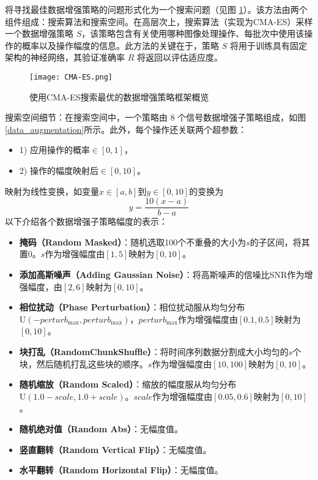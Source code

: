 \documentclass[master]{thesis-uestc}
\begin{document}
将寻找最佳数据增强策略的问题形式化为一个搜索问题（见图 \ref{CMA-ES}）。该方法由两个组件组成：搜索算法和搜索空间。在高层次上，搜索算法（实现为CMA-ES）采样一个数据增强策略 \( S \)，该策略包含有关使用哪种图像处理操作、每批次中使用该操作的概率以及操作幅度的信息。此方法的关键在于，策略 \( S \) 将用于训练具有固定架构的神经网络，其验证准确率 \( R \) 将返回以评估适应度。
\begin{figure}[h]
    \centering
    \texttt{[image: CMA-ES.png]}
    \caption{使用CMA-ES搜索最优的数据增强策略框架概览}
    \label{CMA-ES}
\end{figure}
搜索空间细节：在搜索空间中，一个策略由 8 个信号数据增强子策略组成，如图\ref{data_augmentation}所示。此外，每个操作还关联两个超参数：
\begin{itemize}
    \item 1) 应用操作的概率\(\in [0,1]\)，
    \item 2) 操作的幅度映射后\(\in [0,10]\)。
\end{itemize}
映射为线性变换，如变量\(x \in [a,b]\)到\(y \in [0,10]\)的变换为
\begin{equation}
    y = \frac{10(x - a)}{b - a}
    \end{equation}
以下介绍各个数据增强子策略幅度的表示：
\begin{itemize}
    \item \textbf{掩码（Random Masked）}：随机选取100个不重叠的大小为$s$的子区间，将其置0。$s$作为增强幅度由\([1,5]\)映射为\([0,10]\)。

    \item \textbf{添加高斯噪声（Adding Gaussian Noise）}：将高斯噪声的信噪比SNR作为增强幅度，由\([2,6]\)映射为\([0,10]\)。

    \item \textbf{相位扰动（Phase Perturbation）}：相位扰动服从均匀分布$\text{U}(-perturb_{\text{max}}, perturb_{\text{max}})$，$perturb_{\text{max}}$作为增强幅度由\([0.1,0.5]\)映射为\([0,10]\)。

    \item \textbf{块打乱（RandomChunkShuffle）}：将时间序列数据分割成大小均匀的$s$个块，然后随机打乱这些块的顺序。$s$作为增强幅度由\([10,100]\)映射为\([0,10]\)。

    \item \textbf{随机缩放（Random Scaled）}：缩放的幅度服从均匀分布$\text{U}(1.0-scale, 1.0+scale)$。$scale$作为增强幅度由\([0.05,0.6]\)映射为\([0,10]\)。

    \item \textbf{随机绝对值（Random Abs）}：无幅度值。

    \item \textbf{竖直翻转（Random Vertical Flip）}：无幅度值。

    \item \textbf{水平翻转（Random Horizontal Flip）}：无幅度值。
    
\end{itemize}
\end{document}
